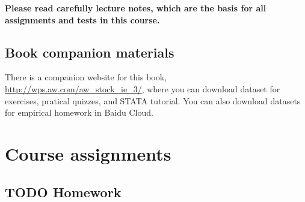 \documentclass[a4paper,11pt]{article}
\begin{document}
\textbf{Please read carefully lecture notes, which are the basis for all assignments and tests in this course.}


\subsection*{Book companion materials}
\label{sec:org1c72773}

There is a companion website for this book,
\url{http://wps.aw.com/aw\_stock\_ie\_3/}, where you can download dataset for
exercises, pratical quizzes, and STATA tutorial. You can also download
datasets for empirical homework in Baidu Cloud.


\section{Course assignments}
\label{sec:orgaebc4f8}
\subsection*{{\bfseries\sffamily TODO} Homework}
\label{sec:orgefd882c}
\end{document}
